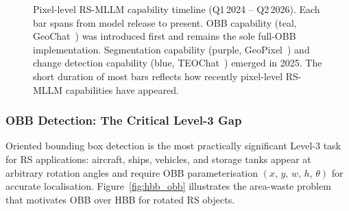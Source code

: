 \begin{figure}[h]
\caption{Pixel-level RS-MLLM capability timeline (Q1\,2024 -- Q2\,2026).
Each bar spans from model release to present. OBB capability (teal,
GeoChat~\cite{geochat2024}) was introduced first and remains the sole full-OBB
implementation. Segmentation capability (purple, GeoPixel~\cite{geopixel2025})
and change detection capability (blue, TEOChat~\cite{teochat2025}) emerged in
2025. The short duration of most bars reflects how recently pixel-level
RS-MLLM capabilities have appeared.}\label{fig:pixel_timeline}
\end{figure}

\subsubsection{OBB Detection: The Critical Level-3 Gap}\label{sec4:obb}

Oriented bounding box detection is the most practically significant Level-3
task for RS applications: aircraft, ships, vehicles, and storage tanks appear
at arbitrary rotation angles and require OBB parameterisation
$(x,\,y,\,w,\,h,\,\theta)$ for accurate localisation.
Figure~\ref{fig:hbb_obb} illustrates the area-waste problem that motivates OBB
over HBB for rotated RS objects.

